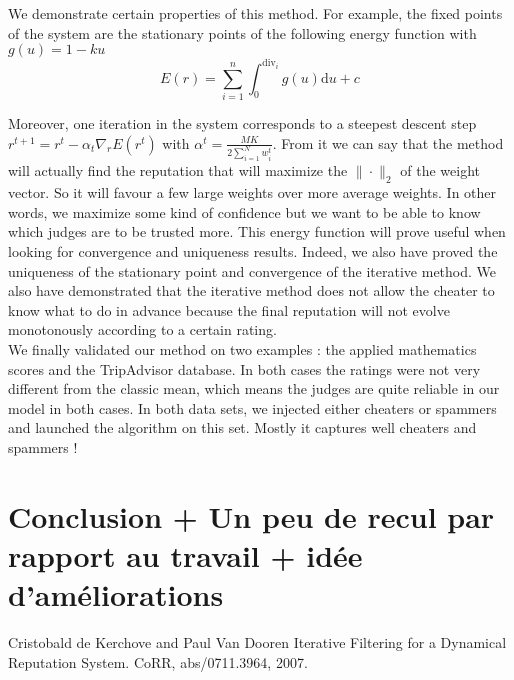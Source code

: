 \documentclass[9pt]{SelfArx} %
\begin{document}
We demonstrate certain properties of this method. For example, the fixed points of the system are the stationary points of the following energy function with $g(u) = 1 - k u$
\[
    E(r) = \sum_{i=1}^{n}\int_0^{\mathrm{div}_i} g(u) \mathrm{d}u + c
\]

Moreover, one iteration in the system corresponds to a steepest descent step $r^{t+1} = r^t - \alpha_t \nabla_r E(r^t)$ with $\alpha^t = \frac{MK}{2\sum_{i=1}^N w_i^t}$. From it we can say that the method will actually find the reputation that will maximize the $\| \cdot \|_2$ of the weight vector. So it will favour a few large weights over more average weights. In other words, we maximize some kind of confidence but we want to be able to know which judges are to be trusted more. This energy function will prove useful when looking for convergence and uniqueness results. Indeed, we also have proved the uniqueness of the stationary point and convergence of the iterative method. We also have demonstrated that the iterative method does not allow the cheater to know what to do in advance because the final reputation will not evolve monotonously according to a certain rating.\\

We finally validated our method on two examples : the applied mathematics scores and the TripAdvisor database. In both cases the ratings were not very different from the classic mean, which means the judges are quite reliable in our model in both cases. In both data sets, we injected either cheaters or spammers and launched the algorithm on this set. Mostly it captures well cheaters and spammers !

\section*{Conclusion + Un peu de recul par rapport au travail + idée d'améliorations}



\begin{thebibliography}{9}
          Cristobald de Kerchove and Paul Van Dooren
          Iterative Filtering for a Dynamical Reputation System.
          CoRR,
          abs/0711.3964,
          2007.
\end{thebibliography}
\end{document}

